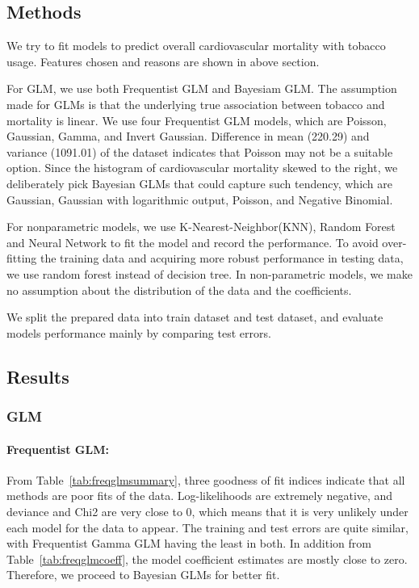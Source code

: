 \documentclass{article}
\begin{document}
\subsection{Methods}
We try to fit models to predict overall cardiovascular mortality with tobacco usage. Features chosen and reasons are shown in above section.

For GLM, we use both Frequentist GLM and Bayesiam GLM. The assumption made for GLMs is that the underlying true association between tobacco and mortality is linear. We use four Frequentist GLM models, which are Poisson, Gaussian, Gamma, and Invert Gaussian. Difference in mean (220.29) and variance (1091.01) of the dataset indicates that Poisson may not be a suitable option. Since the histogram of cardiovascular mortality skewed to the right, we deliberately pick Bayesian GLMs that could capture such tendency, which are Gaussian, Gaussian with logarithmic output, Poisson, and Negative Binomial. 

For nonparametric models, we use K-Nearest-Neighbor(KNN), Random Forest and Neural Network to fit the model and record the performance. To avoid over-fitting the training data and acquiring more robust performance in testing data, we use random forest instead of decision tree. In non-parametric models, we make no assumption about the distribution of the data and the coefficients. 

We split the prepared data into train dataset and test dataset, and evaluate models performance mainly by comparing test errors. 

\subsection{Results}
\subsubsection{GLM}
\paragraph{Frequentist GLM:}
From Table~\ref{tab:freqglmsummary}, three goodness of fit indices indicate that all methods are poor fits of the data. Log-likelihoods are extremely negative, and deviance and Chi2 are very close to 0, which means that it is very unlikely under each model for the data to appear. The training and test errors are quite similar, with Frequentist Gamma GLM having the least in both. In addition from Table~\ref{tab:freqglmcoeff}, the model coefficient estimates are mostly close to zero.  Therefore, we proceed to Bayesian GLMs for better fit. 
\end{document}
